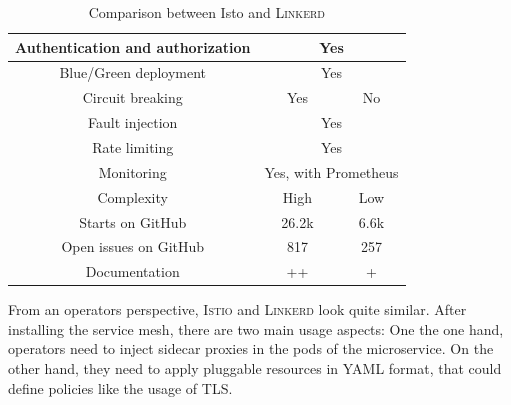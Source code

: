 \begin{table}
\begin{tabular*}{\columnwidth}{c|c|c}
Authentication and authorization & \multicolumn{2}{c}{Yes}                                                                                                          \\\hline
Blue/Green deployment            & \multicolumn{2}{c}{Yes}                                                                                                          \\\hline
Circuit breaking                 & Yes                                                                                                                & No          \\\hline
Fault injection                  & \multicolumn{2}{c}{Yes}                                                                                                          \\\hline
Rate limiting                    & \multicolumn{2}{c}{Yes}                                                                                                          \\\hline
Monitoring                       & \multicolumn{2}{c}{Yes, with Prometheus}                                                                                         \\\hline
Complexity                       & High                                                                                                               & Low         \\\hline
Starts on GitHub \cite{linkerd-github} \cite{istio-github}              & 26.2k & 6.6k        \\\hline
Open issues on GitHub \cite{linkerd-github} \cite{istio-github}                 & 817                                                                                                                & 257         \\\hline
Documentation                    & ++                                                                                                                 & +          
\end{tabular*}
\vspace{0.25mm}
\caption{Comparison between Isto and \textsc{Linkerd}}
\label{tab:istio-linkerd}
\end{table}


%
%
%
%

From an operators perspective, \textsc{Istio} and \textsc{Linkerd} look quite similar. After installing the service mesh, there are two main usage aspects: One the one hand, operators need to inject sidecar proxies in the pods of the microservice. On the other hand, they need to apply pluggable resources in YAML format, that could define policies like the usage of TLS.

